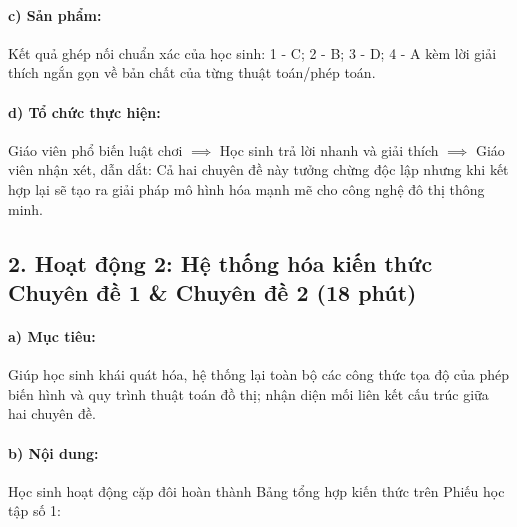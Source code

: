 \documentclass[12pt, a4paper]{article}
\begin{document}
\paragraph{c) Sản phẩm:} Kết quả ghép nối chuẩn xác của học sinh: 1 - C; 2 - B; 3 - D; 4 - A kèm lời giải thích ngắn gọn về bản chất của từng thuật toán/phép toán.

\paragraph{d) Tổ chức thực hiện:} Giáo viên phổ biến luật chơi $\implies$ Học sinh trả lời nhanh và giải thích $\implies$ Giáo viên nhận xét, dẫn dắt: Cả hai chuyên đề này tưởng chừng độc lập nhưng khi kết hợp lại sẽ tạo ra giải pháp mô hình hóa mạnh mẽ cho công nghệ đô thị thông minh.

\subsection*{2. Hoạt động 2: Hệ thống hóa kiến thức Chuyên đề 1 \& Chuyên đề 2 (18 phút)}

\paragraph{a) Mục tiêu:} Giúp học sinh khái quát hóa, hệ thống lại toàn bộ các công thức tọa độ của phép biến hình và quy trình thuật toán đồ thị; nhận diện mối liên kết cấu trúc giữa hai chuyên đề.

\paragraph{b) Nội dung:} Học sinh hoạt động cặp đôi hoàn thành Bảng tổng hợp kiến thức trên Phiếu học tập số 1:
\end{document}
